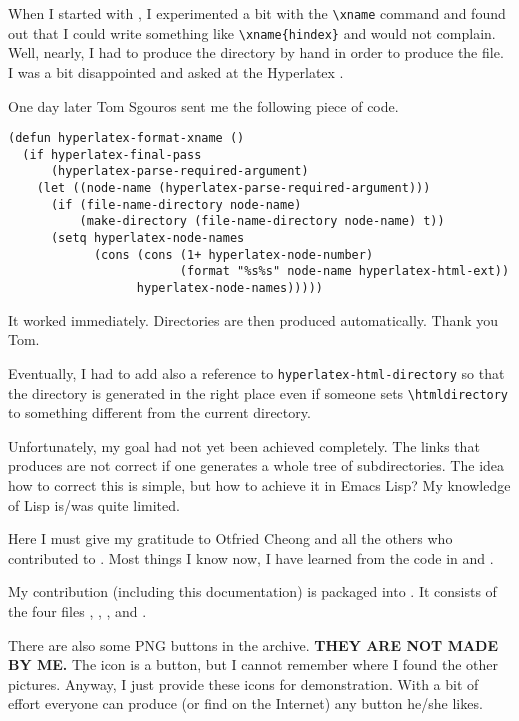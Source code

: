 When I started with \HLX{}, I experimented a bit with the
\verb'\xname' command and found out that I could write something like
\verb'\xname{hindex}' and \HLX{} would not complain. Well,
nearly, I had to produce the directory  by hand in
order to produce the  file.
%
I was a bit disappointed and asked at the Hyperlatex
.

One day later Tom Sgouros sent me the following piece of code.
\begin{verbatim}
(defun hyperlatex-format-xname ()
  (if hyperlatex-final-pass
      (hyperlatex-parse-required-argument)
    (let ((node-name (hyperlatex-parse-required-argument)))
      (if (file-name-directory node-name)
          (make-directory (file-name-directory node-name) t))
      (setq hyperlatex-node-names
            (cons (cons (1+ hyperlatex-node-number)
                        (format "%s%s" node-name hyperlatex-html-ext))
                  hyperlatex-node-names)))))
\end{verbatim}
It worked immediately. Directories are then produced automatically.
Thank you Tom.

Eventually, I had to add also a reference to
\verb'hyperlatex-html-directory' so that the directory is generated in
the right place even if someone sets \verb'\htmldirectory' to
something different from the current directory.

Unfortunately, my goal had not yet been achieved completely. The links
that \HLX{} produces are not correct if one generates a whole tree of
subdirectories. The idea how to correct this is simple, but how to
achieve it in Emacs Lisp? My knowledge of Lisp is/was quite limited.

Here I must give my gratitude to Otfried Cheong and all the others who
contributed to \HLX{}. Most things I know now, I have learned from the
code in  and .

My contribution (including this documentation) is packaged into
. It consists of the
four files , ,
, and .

There are also some PNG buttons in the archive.
%
\textbf{THEY ARE NOT MADE BY ME.}
%
The  icon is a  button,
but I cannot remember where I found the other pictures. Anyway, I just
provide these icons for demonstration. With a bit of effort everyone
can produce (or find on the Internet) any button he/she likes.











